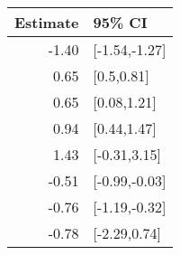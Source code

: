 \begin{tabular}{rl}
  \hline
Estimate & 95\% CI \\ 
  \hline
-1.40 & [-1.54,-1.27] \\ 
  0.65 & [0.5,0.81] \\ 
  0.65 & [0.08,1.21] \\ 
  0.94 & [0.44,1.47] \\ 
  1.43 & [-0.31,3.15] \\ 
  -0.51 & [-0.99,-0.03] \\ 
  -0.76 & [-1.19,-0.32] \\ 
  -0.78 & [-2.29,0.74] \\ 
   \hline
\end{tabular}

